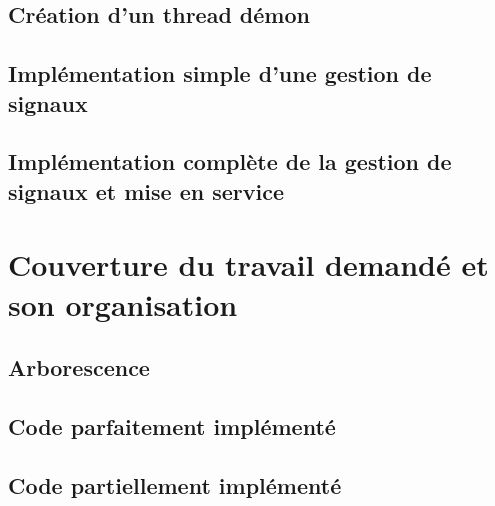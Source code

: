 \documentclass{report}
\begin{document}
\section{Création d'un thread démon}

\section{Implémentation simple d'une gestion de signaux}

\section{Implémentation complète de la gestion de signaux et mise en service}

\chapter{Couverture du travail demandé et son organisation}
\setcounter{section}{0}
\section{Arborescence}

\section{Code parfaitement implémenté}

\section{Code partiellement implémenté}
\end{document}
